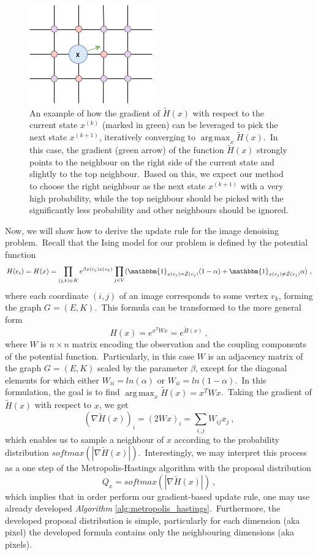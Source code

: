 \documentclass[shortabstract, english, lic]{iithesis}
\DeclareMathOperator*{\argmax}{arg\,max}
\theoremstyle{default_theorem_style}\newtheorem{theorem}{Theorem}
\theoremstyle{default_theorem_style}\newtheorem{definition}{Definition}
\begin{document}
\begin{figure}[t]
\centering
\includegraphics[scale=0.9]{gradient_example}
\caption{An example of how the gradient of $\tilde{H}(x)$ with respect to the current state $x^{(k)}$ (marked in green)
can be leveraged to pick the next state $x^{(k + 1)}$, iteratively converging to $\argmax_x \tilde{H}(x)$.\ In this
case, the gradient (green arrow) of the function $\tilde{H}(x)$ strongly points to the neighbour on the right side
of the current state and slightly to the top neighbour.\ Based on this, we expect our method to choose the right
neighbour as the next state $x^{(k + 1)}$ with a very high probability, while the top neighbour should be picked with
the significantly less probability and other neighbours should be ignored.}
\label{fig:gradient_example}
\end{figure}

\noindent Now, we will show how to derive the update rule for the image denoising problem.\ Recall that the Ising model
for our problem is defined by the potential function
$$
H(e_i) = H(x) = \prod\limits_{(j, k) \in K} e^{\beta x(v_j)x(v_k)}
\prod\limits_{j \in V}( \mathbbm{1}_{x(v_j) = \tilde{Z}(v_j)}(1 - \alpha) +
\mathbbm{1}_{x(v_j) \neq \tilde{Z}(v_j)}\alpha)\ ,
$$
where each coordinate $(i, j)$ of an image corresponds to some vertex $v_k$, forming the graph $G = (E, K)$.\ This
formula can be transformed to the more general form
$$
H(x) = e^{x^T W x} = e^{\tilde{H}(x)}\ ,
$$
where $W$ is $n \times n$ matrix encoding the observation and the coupling components of the potential
function.\ Particularly, in this case $W$ is an adjacency matrix of the graph $G = (E, K)$ scaled by the parameter
$\beta$, except for the diagonal elements for which either $W_{ii} = ln(\alpha)$ or $W_{ii} = ln(1 - \alpha)$.\ In
this formulation, the goal is to find $\argmax_x \tilde{H}(x) = x^T W x$.\ Taking the gradient of
$\tilde{H}(x)$ with respect to $x$, we get
$$
(\nabla \tilde{H}(x))_i = (2W x)_i = \sum_{i, j} W_{ij} x_j\ ,
$$
which enables us to sample a neighbour of $x$ according to the probability distribution
$softmax(|\nabla \tilde{H}(x)|)$.\ Interestingly, we may interpret this process as a one step of the
Metropolis-Hastings algorithm with the proposal distribution
$$
Q_x = softmax(|\nabla \tilde{H}(x)|)\ ,
$$
which implies that in order perform our gradient-based update rule, one may use already developed
\textit{Algorithm} \ref{alg:metropolis_hastings}.\ Furthermore, the developed proposal distribution is simple,
particularly for each dimension (aka pixel) the developed formula contains only the neighbouring
dimensions (aka pixels).
\end{document}
